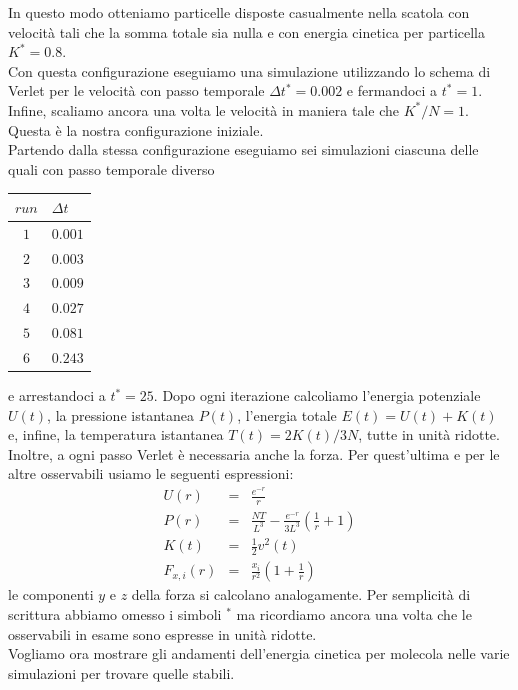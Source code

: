 \documentclass[a4paper,11pt]{article}
\begin{document}
In questo modo otteniamo particelle disposte casualmente nella scatola con velocità tali che la somma totale sia nulla e con energia cinetica per particella $K^* = 0.8$.\\
Con questa configurazione eseguiamo una simulazione utilizzando lo schema di Verlet per le velocità con passo temporale $\Delta t^* = 0.002$ e fermandoci a $t^* = 1$. Infine, scaliamo ancora una volta le velocità in maniera tale che $K^*/N = 1$. Questa è la nostra configurazione iniziale.
\\
\noindent Partendo dalla stessa configurazione eseguiamo sei simulazioni  ciascuna delle quali con passo temporale diverso
\begin{table}[H]
	\centering
	\begin{tabular}{cl} 
		\hline
		$run$	&	$\Delta t$ \\
		\hline
		$1$	&	$0.001$\\
		$2$	&	$0.003$	\\
		$3$	&	$0.009$	\\
		$4$	&	$0.027$	\\
		$5$	&	$0.081$	\\
		$6$	&	$0.243$	\\\hline
	\end{tabular}
\end{table}
\medskip
\noindent e arrestandoci a $t^* = 25$. Dopo ogni iterazione calcoliamo l'energia potenziale $U(t)$, la pressione istantanea $P(t)$, l'energia totale $E(t)=U(t)+K(t)$ e, infine, la temperatura istantanea $T(t)=2K(t)/3N$, tutte in unità ridotte. Inoltre, a ogni passo Verlet è necessaria anche la forza. Per quest'ultima e per le altre osservabili usiamo le seguenti espressioni:
\begin{eqnarray}
U(r) & = & \frac{e^{-r}}{r}\\
P(r) & = & \frac{NT}{L^{3}} - \frac{e^{-r}}{3L^{3}}\left(\frac{1}{r} + 1\right)\\
K(t) & = & \frac{1}{2}v^2(t)\\
F_{x,i}(r) & = & \frac{x_i}{r^2} \left(1+\frac{1}{r}\right)
\end{eqnarray}
le componenti $y$ e $z$ della forza si calcolano analogamente. Per semplicità di scrittura abbiamo omesso i simboli $^*$ ma ricordiamo ancora una volta che le osservabili in esame sono espresse in unità ridotte. \\Vogliamo ora mostrare gli andamenti dell'energia cinetica per molecola nelle varie simulazioni per trovare quelle stabili.
\end{document}
